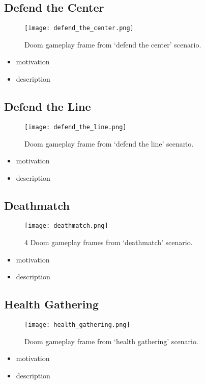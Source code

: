 \subsection{Defend the Center}
	\begin{figure}
		\centering
		\texttt{[image: defend\_the\_center.png]}
		\caption{Doom gameplay frame from `defend the center' scenario.}\label{fig:basic}
	\end{figure}
\begin{itemize}
	\item motivation
	\item description
\end{itemize}

\newpage
\subsection{Defend the Line}
	\begin{figure}
		\centering
		\texttt{[image: defend\_the\_line.png]}
		\caption{Doom gameplay frame from `defend the line' scenario.}\label{fig:defend_the_line}
	\end{figure}
\begin{itemize}
	\item motivation
	\item description
\end{itemize}

\newpage
\subsection{Deathmatch}
	\begin{figure}
		\centering
		\texttt{[image: deathmatch.png]}
		\caption{4 Doom gameplay frames from `deathmatch' scenario.}\label{fig:deatchmatch}
	\end{figure}
\begin{itemize}
	\item motivation
	\item description
\end{itemize}


\newpage
\subsection{Health Gathering}
	\begin{figure}
		\centering
		\texttt{[image: health\_gathering.png]}
		\caption{Doom gameplay frame from `health gathering' scenario.}\label{fig:health_gathering}
	\end{figure}
\begin{itemize}
	\item motivation
	\item description
\end{itemize}

